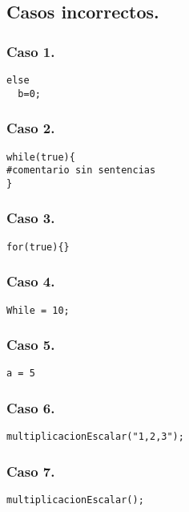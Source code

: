 \subsection{Casos incorrectos.}
\subsubsection{Caso 1.}

\begin{verbatim}
else
  b=0;

\end{verbatim}

\subsubsection{Caso 2.}

\begin{verbatim}
while(true){
#comentario sin sentencias
}

\end{verbatim}

\subsubsection{Caso 3.}

\begin{verbatim}
for(true){}
\end{verbatim}

\subsubsection{Caso 4.}

\begin{verbatim}
While = 10;
\end{verbatim}

\subsubsection{Caso 5.}

\begin{verbatim}
a = 5
\end{verbatim}

\subsubsection{Caso 6.}

\begin{verbatim}
multiplicacionEscalar("1,2,3");
\end{verbatim}

\subsubsection{Caso 7.}

\begin{verbatim}
multiplicacionEscalar();
\end{verbatim}

